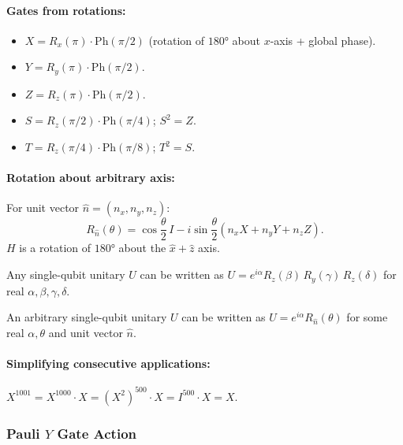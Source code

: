 \documentclass[10pt,a4paper]{article}
\begin{document}
\paragraph{Gates from rotations:}
\begin{itemize}[nosep]
\item $X = R_x(\pi)\cdot\mathrm{Ph}(\pi/2)$ (rotation of $180°$ about $x$-axis + global phase).
\item $Y = R_y(\pi)\cdot\mathrm{Ph}(\pi/2)$.
\item $Z = R_z(\pi)\cdot\mathrm{Ph}(\pi/2)$.
\item $S = R_z(\pi/2)\cdot\mathrm{Ph}(\pi/4)$; $S^2=Z$.
\item $T = R_z(\pi/4)\cdot\mathrm{Ph}(\pi/8)$; $T^2=S$.
\end{itemize}

\paragraph{Rotation about arbitrary axis:} For unit vector $\hat{n}=(n_x,n_y,n_z)$:
\[
R_{\hat{n}}(\theta)=\cos\frac{\theta}{2}\,I - i\sin\frac{\theta}{2}(n_x X+n_y Y+n_z Z).
\]
$H$ is a rotation of $180°$ about the $\hat{x}+\hat{z}$ axis.

\begin{tcolorbox}[propstyle, title={Theorem: $Z$--$Y$ Decomposition}]
Any single-qubit unitary $U$ can be written as $U=e^{i\alpha}R_z(\beta)\,R_y(\gamma)\,R_z(\delta)$ for real $\alpha,\beta,\gamma,\delta$.
\end{tcolorbox}

\begin{tcolorbox}[propstyle, title={Theorem: Arbitrary Unitary Operator}]
An arbitrary single-qubit unitary $U$ can be written as $U=e^{i\alpha}R_{\hat{n}}(\theta)$ for some real $\alpha,\theta$ and unit vector $\hat{n}$.
\end{tcolorbox}





\paragraph{Simplifying consecutive applications:} $X^{1001}=X^{1000}\cdot X=(X^2)^{500}\cdot X=I^{500}\cdot X=X$.

\subsubsection*{Pauli $Y$ Gate Action}
\end{document}

